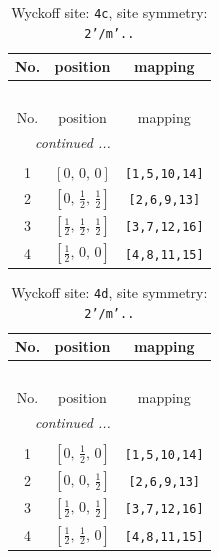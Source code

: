 \documentclass[fleqn,8pt]{jsarticle}
\begin{document}
\renewcommand{\arraystretch}{1.2}
\begin{longtable}{ccc}
\caption{Wyckoff site: {\tt 4c}, site symmetry: {\tt 2'/m'..}}
 \\
 \hline \hline
No. & position & mapping \\ \hline \endfirsthead

\multicolumn{2}{l}{\tablename\ \thetable{}} \\
 \hline \hline
No. & position & mapping \\ \hline \endhead

 \hline \hline
\multicolumn{2}{r}{\footnotesize\it continued ...} \\ \endfoot

 \hline \hline
\multicolumn{2}{r}{} \\ \endlastfoot

1 & $\left[ 0,\, 0,\, 0 \right]$ & {\tt [1,5,10,14]} \\ \hline
2 & $\left[ 0,\, \frac{1}{2},\, \frac{1}{2} \right]$ & {\tt [2,6,9,13]} \\ \hline
3 & $\left[ \frac{1}{2},\, \frac{1}{2},\, \frac{1}{2} \right]$ & {\tt [3,7,12,16]} \\ \hline
4 & $\left[ \frac{1}{2},\, 0,\, 0 \right]$ & {\tt [4,8,11,15]} \\
\end{longtable}
\renewcommand{\arraystretch}{1.2}
\begin{longtable}{ccc}
\caption{Wyckoff site: {\tt 4d}, site symmetry: {\tt 2'/m'..}}
 \\
 \hline \hline
No. & position & mapping \\ \hline \endfirsthead

\multicolumn{2}{l}{\tablename\ \thetable{}} \\
 \hline \hline
No. & position & mapping \\ \hline \endhead

 \hline \hline
\multicolumn{2}{r}{\footnotesize\it continued ...} \\ \endfoot

 \hline \hline
\multicolumn{2}{r}{} \\ \endlastfoot

1 & $\left[ 0,\, \frac{1}{2},\, 0 \right]$ & {\tt [1,5,10,14]} \\ \hline
2 & $\left[ 0,\, 0,\, \frac{1}{2} \right]$ & {\tt [2,6,9,13]} \\ \hline
3 & $\left[ \frac{1}{2},\, 0,\, \frac{1}{2} \right]$ & {\tt [3,7,12,16]} \\ \hline
4 & $\left[ \frac{1}{2},\, \frac{1}{2},\, 0 \right]$ & {\tt [4,8,11,15]} \\
\end{longtable}
\end{document}
